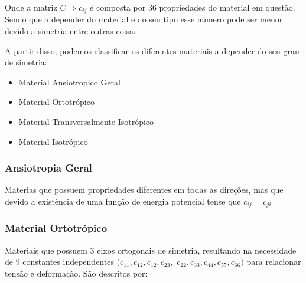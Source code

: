 \documentclass{article}
\begin{document}
Onde a matriz $C\Rightarrow c_{ij}$ é composta por 36 propriedades do material em questão. Sendo que a depender do material e do seu tipo esse número pode ser menor devido a simetria entre outras coisas.

A partir disso, podemos classificar os diferentes materiais a depender do seu grau de simetria:
\begin{itemize}
    \item Material Ansiotropico Geral
    \item Material Ortotrópico
    \item Material Transversalmente Isotrópico
    \item Material Isotrópico
\end{itemize}

\subsubsection*{Ansiotropia Geral}
Materias que possuem propriedades diferentes em todas as direções, mas que devido a existência de uma função de energia potencial tense que $c_{ij} = c_{ji}$

\subsubsection*{Material Ortotrópico}
Materiais que possuem 3 eixos ortogonais de simetria, resultando na necessidade de 9 constantes independentes $(c_{11}, c_{12}, c_{12}, c_{23}, $ $c_{22}, c_{33}, c_{44}, c_{55}, c_{66})$ para relacionar tensão e deformação. São descritos por:
\end{document}
